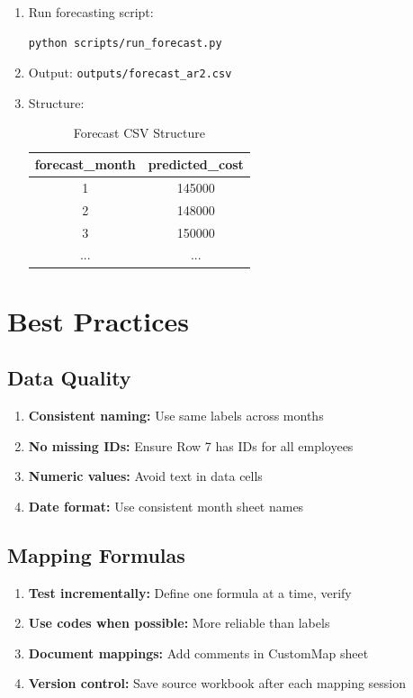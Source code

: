 \begin{enumerate}
    \item Run forecasting script:
    \begin{lstlisting}
python scripts/run_forecast.py
    \end{lstlisting}
    
    \item Output: \texttt{outputs/forecast\_ar2.csv}
    
    \item Structure:
    \begin{table}[H]
    \centering
    \begin{tabular}{cc}
    \toprule
    \textbf{forecast\_month} & \textbf{predicted\_cost} \\
    \midrule
    1 & 145000 \\
    2 & 148000 \\
    3 & 150000 \\
    ... & ... \\
    \bottomrule
    \end{tabular}
    \caption{Forecast CSV Structure}
    \end{table}
\end{enumerate}

\section{Best Practices}

\subsection{Data Quality}

\begin{enumerate}
    \item \textbf{Consistent naming:} Use same labels across months
    \item \textbf{No missing IDs:} Ensure Row 7 has IDs for all employees
    \item \textbf{Numeric values:} Avoid text in data cells
    \item \textbf{Date format:} Use consistent month sheet names
\end{enumerate}

\subsection{Mapping Formulas}

\begin{enumerate}
    \item \textbf{Test incrementally:} Define one formula at a time, verify
    \item \textbf{Use codes when possible:} More reliable than labels
    \item \textbf{Document mappings:} Add comments in CustomMap sheet
    \item \textbf{Version control:} Save source workbook after each mapping session
\end{enumerate}

